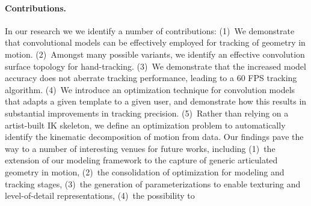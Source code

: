 \paragraph{Contributions.}
In our research we we identify a number of contributions:
(1)~We demonstrate that convolutional models can be effectively employed for tracking of geometry in motion. 
(2)~Amongst many possible variants, we identify an effective convolution surface  topology for hand-tracking. 
(3)~We demonstrate that the increased model accuracy does not aberrate tracking performance, leading to a 60 FPS tracking algorithm.
(4)~We introduce an optimization technique for convolution models that adapts a given template to a given user, and demonstrate how this results in substantial improvements in tracking precision.
(5)~Rather than relying on a artist-built IK skeleton, we define an optimization problem to automatically identify the kinematic decomposition of motion from data.
%
\hspace{0in}
% 
Our findings pave the way to a number of interesting venues for future works, including (1)~the extension of our modeling framework to the capture of generic articulated geometry in motion, (2)~the consolidation of optimization for modeling and tracking stages, 
(3)~the generation of parameterizations to enable texturing and level-of-detail representations, 
(4)~the possibility to 
% 



